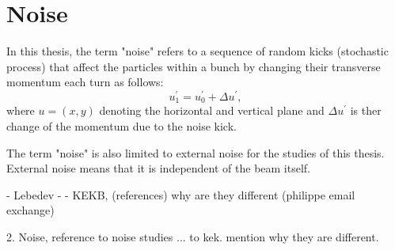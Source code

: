 \section{Noise}\label{sec:noise_definition}
In this thesis, the term "noise" refers to a sequence of random kicks (stochastic process) that affect the particles within a bunch by changing their transverse momentum each turn as follows:
\begin{equation}\label{eq:external_noise}
    u^\prime_1 =  u^\prime_0 + \Delta u^\prime,
\end{equation}
where $u=(x,y)$ denoting the horizontal and vertical plane and $\Delta u^\prime$ is ther change of the momentum due to the noise kick. 

The term "noise" is also limited to external noise for the studies of this thesis. External noise means that it is independent of the beam itself.






- Lebedev
- 
- KEKB, (references) why are they different (philippe email exchange)

2. Noise, reference to noise studies ... to kek. mention why they are different.\\


